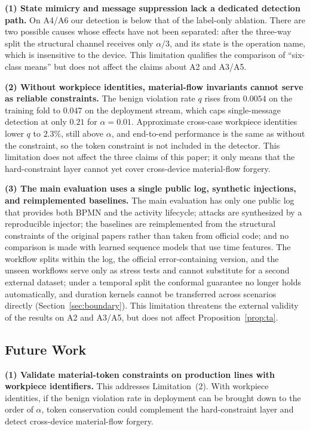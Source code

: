 \documentclass[manuscript,screen,review]{acmart}
\begin{document}
\textbf{(1) State mimicry and message suppression lack a dedicated detection path.}
On {A4}/{A6} our detection is below that of the label-only ablation. There are two possible causes whose effects have not been separated: after the three-way split the structural channel receives only $\alpha/3$, and its state is the operation name, which is insensitive to the device. This limitation qualifies the comparison of ``six-class means'' but does not affect the claims about {A2} and {A3}/{A5}.

\textbf{(2) Without workpiece identities, material-flow invariants cannot serve as reliable constraints.}
The benign violation rate $q$ rises from $0.0054$ on the training fold to $0.047$ on the deployment stream, which caps single-message detection at only $0.21$ for $\alpha=0.01$. Approximate cross-case workpiece identities lower $q$ to $2.3\%$, still above $\alpha$, and end-to-end performance is the same as without the constraint, so the token constraint is not included in the detector. This limitation does not affect the three claims of this paper; it only means that the hard-constraint layer cannot yet cover cross-device material-flow forgery.

\textbf{(3) The main evaluation uses a single public log, synthetic injections, and reimplemented baselines.}
The main evaluation has only one public log that provides both {BPMN} and the activity lifecycle; attacks are synthesized by a reproducible injector; the baselines are reimplemented from the structural constraints of the original papers rather than taken from official code; and no comparison is made with learned sequence models that use time features. The workflow splits within the log, the official error-containing version, and the unseen workflows serve only as stress tests and cannot substitute for a second external dataset; under a temporal split the conformal guarantee no longer holds automatically, and duration kernels cannot be transferred across scenarios directly (Section~\ref{sec:boundary}). This limitation threatens the external validity of the results on {A2} and {A3}/{A5}, but does not affect Proposition~\ref{prop:ta}.

\subsection{Future Work}
\label{sec:future_work}

\textbf{(1) Validate material-token constraints on production lines with workpiece identifiers.}
This addresses Limitation~(2). With workpiece identities, if the benign violation rate in deployment can be brought down to the order of $\alpha$, token conservation could complement the hard-constraint layer and detect cross-device material-flow forgery.
\end{document}
